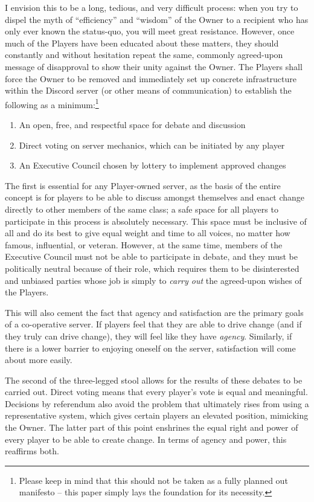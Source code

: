I envision this to be a long, tedious, and very difficult process: when you try to dispel the myth of “efficiency” and “wisdom” of the Owner to a recipient who has only ever known the status-quo, you will meet great resistance. However, once much of the Players have been educated about these matters, they should constantly and without hesitation repeat the same, commonly agreed-upon message of disapproval to show their unity against the Owner. The Players shall force the Owner to be removed and immediately set up concrete infrastructure within the Discord server (or other means of communication) to establish the following as a minimum:\footnote{Please keep in mind that this should not be taken as a fully planned out manifesto – this paper simply lays the foundation for its necessity.}\begin{enumerate}
    \item An open, free, and respectful space for debate and discussion
    \item Direct voting on server mechanics, which can be initiated by any player
    \item An Executive Council chosen by lottery to implement approved changes
\end{enumerate}
The first is essential for any Player-owned server, as the basis of the entire concept is for players to be able to discuss amongst themselves and enact change directly to other members of the same class; a safe space for all players to participate in this process is absolutely necessary. This space must be inclusive of all and do its best to give equal weight and time to all voices, no matter how famous, influential, or veteran. However, at the same time, members of the Executive Council must not be able to participate in debate, and they must be politically neutral because of their role, which requires them to be disinterested and unbiased parties whose job is simply to \emph{carry out} the agreed-upon wishes of the Players.

This will also cement the fact that agency and satisfaction are the primary goals of a co-operative server. If players feel that they are able to drive change (and if they truly can drive change), they will feel like they have \emph{agency}. Similarly, if there is a lower barrier to enjoying oneself on the server, satisfaction will come about more easily.

The second of the three-legged stool allows for the results of these debates to be carried out. Direct voting means that every player’s vote is equal and meaningful. Decisions by referendum also avoid the problem that ultimately rises from using a representative system, which gives certain players an elevated position, mimicking the Owner. The latter part of this point enshrines the equal right and power of every player to be able to create change. In terms of agency and power, this reaffirms both.

